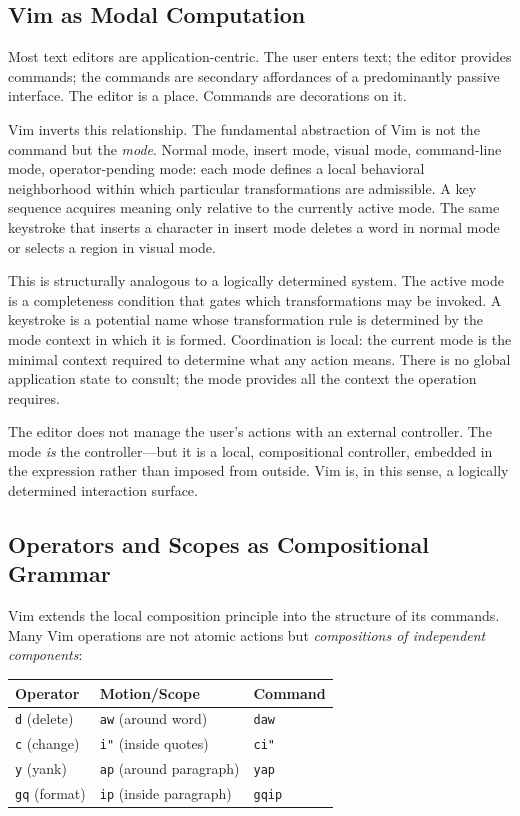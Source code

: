 \documentclass[12pt, a4paper]{article}
\begin{document}
\subsection{Vim as Modal Computation}

Most text editors are application-centric. The user enters text;
the editor provides commands; the commands are secondary
affordances of a predominantly passive interface. The editor is
a place. Commands are decorations on it.

Vim inverts this relationship. The fundamental abstraction of Vim
is not the command but the \emph{mode}. Normal mode, insert mode,
visual mode, command-line mode, operator-pending mode: each mode
defines a local behavioral neighborhood within which particular
transformations are admissible. A key sequence acquires meaning
only relative to the currently active mode. The same keystroke
that inserts a character in insert mode deletes a word in normal
mode or selects a region in visual mode.

This is structurally analogous to a logically determined system.
The active mode is a completeness condition that gates which
transformations may be invoked. A keystroke is a potential name
whose transformation rule is determined by the mode context in
which it is formed. Coordination is local: the current mode is
the minimal context required to determine what any action means.
There is no global application state to consult; the mode
provides all the context the operation requires.

The editor does not manage the user's actions with an external
controller. The mode \emph{is} the controller---but it is a
local, compositional controller, embedded in the expression
rather than imposed from outside. Vim is, in this sense, a
logically determined interaction surface.

\subsection{Operators and Scopes as Compositional Grammar}

Vim extends the local composition principle into the structure
of its commands. Many Vim operations are not atomic actions
but \emph{compositions of independent components}:

\begin{center}
\begin{tabular}{lll}
\textbf{Operator} & \textbf{Motion/Scope} & \textbf{Command} \\
\hline
\texttt{d} (delete) & \texttt{aw} (around word) & \texttt{daw} \\
\texttt{c} (change) & \texttt{i"} (inside quotes) & \texttt{ci"} \\
\texttt{y} (yank)   & \texttt{ap} (around paragraph) & \texttt{yap} \\
\texttt{gq} (format) & \texttt{ip} (inside paragraph) & \texttt{gqip} \\
\end{tabular}
\end{center}
\end{document}
